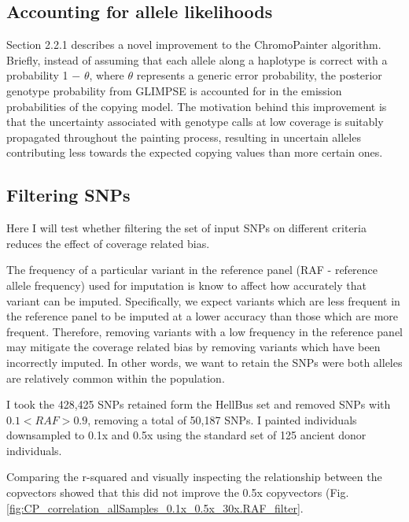 \subsection{Accounting for allele likelihoods}

Section 2.2.1 describes a novel improvement to the ChromoPainter algorithm. Briefly, instead of assuming that each allele along a haplotype is correct with a probability 1 $-$ $\theta$, where $\theta$ represents a generic error probability, the posterior genotype probability from GLIMPSE is accounted for in the emission probabilities of the copying model. The motivation behind this improvement is that the uncertainty associated with genotype calls at low coverage is suitably propagated throughout the painting process, resulting in uncertain alleles contributing less towards the expected copying values than more certain ones.  


\subsection{Filtering SNPs}

Here I will test whether filtering the set of input SNPs on different criteria reduces the effect of coverage related bias. 

The frequency of a particular variant in the reference panel (RAF - reference allele frequency) used for imputation is know to affect how accurately that variant can be imputed. Specifically, we expect variants which are less frequent in the reference panel to be imputed at a lower accuracy than those which are more frequent. Therefore, removing variants with a low frequency in the reference panel may mitigate the coverage related bias by removing variants which have been incorrectly imputed. In other words, we want to retain the SNPs were both alleles are relatively common within the population. 

I took the 428,425 SNPs retained form the HellBus set and removed SNPs with $0.1 < RAF > 0.9$, removing a total of 50,187 SNPs. I painted individuals downsampled to 0.1x and 0.5x using the standard set of 125 ancient donor individuals. 

Comparing the r-squared and visually inspecting the relationship between the copvectors showed that this did not improve the 0.5x copyvectors (Fig.  \ref{fig:CP_correlation_allSamples_0.1x_0.5x_30x.RAF_filter}.


